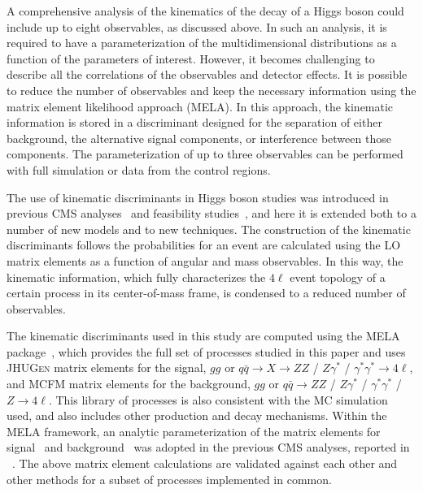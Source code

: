 A comprehensive analysis of the kinematics of the decay of a Higgs boson could include up to eight observables,
as discussed above. In such an analysis, it is required to have a parameterization of the multidimensional
distributions as a function of the parameters of interest. However, it becomes challenging to describe all
the correlations of the observables and detector effects. It is possible to reduce the number of observables
and keep the necessary information using the matrix element likelihood approach (MELA).
In this approach, the kinematic information is stored in a discriminant designed for the separation of
either background, the alternative signal components, or interference between those components.
The parameterization of up to three observables can be performed with full simulation or data from
the control regions.

The use of kinematic discriminants in Higgs boson studies was introduced in
previous CMS analyses~\cite{Chatrchyan:2012ufa,Chatrchyan:2012jja, Chatrchyan:2013mxa,Khachatryan:2014iha}
and feasibility studies~\cite{Bolognesi:2012mm,Anderson:2013afp},
and here it is extended both to a number of new models and to new techniques.
The construction of the kinematic discriminants follows the probabilities for an event are calculated using the LO matrix elements as a function
of angular and mass observables. In this way, the kinematic information, which fully characterizes
the $4\ell$ event topology of a certain process in its center-of-mass frame, is condensed to a
reduced number of observables.

The kinematic discriminants used in this study are computed using the \textsc{MELA}
package~\cite{Chatrchyan:2012ufa,Gao:2010qx,Bolognesi:2012mm,Anderson:2013afp},
which provides the full set of processes studied in this paper and uses \textsc{JHUGen} matrix elements
for the  signal,  $gg$ or $q\bar{q}\to X\to ZZ$ / $Z\gamma^*$ / $\gamma^*\gamma^*\to4\ell$,
and \textsc{MCFM} matrix elements for the background,
$gg$ or $q\bar{q}\to ZZ$ / $Z\gamma^*$ / $\gamma^*\gamma^*$ / $Z\to 4\ell$.
This library of processes is also consistent with the MC simulation used, and also includes other production and decay mechanisms.
Within the \textsc{MELA} framework, an analytic parameterization of the matrix elements
for signal~\cite{Gao:2010qx,Bolognesi:2012mm} and background~\cite{Chen:2012jy} was adopted in the previous CMS
analyses, reported in ~\cite{Chatrchyan:2012ufa,Chatrchyan:2013lba,Chatrchyan:2012jja}.
The above matrix element calculations are validated against each other and other methods for a subset of processes implemented in common.

